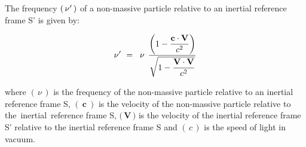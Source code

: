 \documentclass[10pt,fleqn]{article}
\begin{document}
\vspace{+0.60em}

\par {}

\bigskip \smallskip

\noindent The frequency $( \, \nu\hspace{+0.03em}' \, )$ of a non-massive particle relative to an inertial reference frame S' is given by:
\par \vspace{-0.60em}
\begin{eqnarray*}
\nu\hspace{+0.03em}' ~=~ \: \nu \;\, \dfrac{\left ( 1 - \dfrac{\mathbf{c} \cdot \mathbf{V}}{c^2} \right )}{\sqrt{1 - \dfrac{\mathbf{V} \cdot \mathbf{V}}{c^2}}}
\end{eqnarray*}
\par \vspace{+0.45em}
\noindent where $( \, \nu \, )$ is the frequency of the non-massive particle relative to an inertial reference frame S, $( \: \mathbf{c} \: )$ is the velocity of the non-massive particle relative to \hbox {the inertial reference} frame S, $( \, ${\small $\mathbf{V}$}$ \, )$ is the velocity of the inertial reference frame S' relative to the inertial reference frame S and $( \, c \, )$ is the speed of light in vacuum.

\newpage

\par {}

\smallskip

\par {}

\bigskip \bigskip
\end{document}
